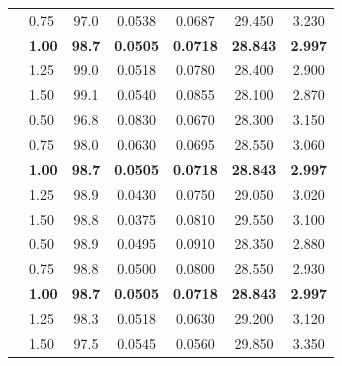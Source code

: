 \documentclass[lettersize,journal]{IEEEtran}
\begin{document}
\begin{table}[!t]
{\begin{tabular}{@{}llccccc@{}}
 & 0.75          & 97.0          & 0.0538          & 0.0687          & 29.450          & 3.230 \\
 & \textbf{1.00} & \textbf{98.7} & \textbf{0.0505} & \textbf{0.0718} & \textbf{28.843} & \textbf{2.997} \\
 & 1.25          & 99.0          & 0.0518          & 0.0780          & 28.400          & 2.900 \\
 & 1.50          & 99.1          & 0.0540          & 0.0855          & 28.100          & 2.870 \\
\midrule
{}
 & 0.50          & 96.8          & 0.0830          & 0.0670          & 28.300          & 3.150 \\
 & 0.75          & 98.0          & 0.0630          & 0.0695          & 28.550          & 3.060 \\
 & \textbf{1.00} & \textbf{98.7} & \textbf{0.0505} & \textbf{0.0718} & \textbf{28.843} & \textbf{2.997} \\
 & 1.25          & 98.9          & 0.0430          & 0.0750          & 29.050          & 3.020 \\
 & 1.50          & 98.8          & 0.0375          & 0.0810          & 29.550          & 3.100 \\
\midrule
{}
 & 0.50          & 98.9          & 0.0495          & 0.0910          & 28.350          & 2.880 \\
 & 0.75          & 98.8          & 0.0500          & 0.0800          & 28.550          & 2.930 \\
 & \textbf{1.00} & \textbf{98.7} & \textbf{0.0505} & \textbf{0.0718} & \textbf{28.843} & \textbf{2.997} \\
 & 1.25          & 98.3          & 0.0518          & 0.0630          & 29.200          & 3.120 \\
 & 1.50          & 97.5          & 0.0545          & 0.0560          & 29.850          & 3.350 \\
\bottomrule
\end{tabular}
}
\end{table}
\end{document}
